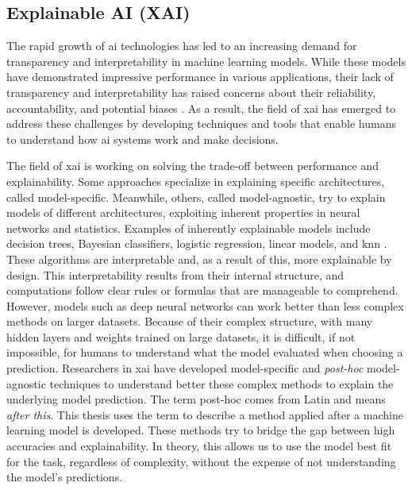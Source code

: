 
\subsection{Explainable AI (XAI)}
The rapid growth of \gls{ai} technologies has led to an increasing demand for transparency and interpretability in machine learning models. While these models have demonstrated impressive performance in various applications, their lack of transparency and interpretability has raised concerns about their reliability, accountability, and potential biases \cite{dattaAutomatedExperimentsAd2015, ntoutsiBiasDatadrivenArtificial2020}. As a result, the field of \gls{xai} has emerged to address these challenges by developing techniques and tools that enable humans to understand how \gls{ai} systems work and make decisions.


The field of \gls{xai} is working on solving the trade-off between performance and explainability. Some approaches specialize in explaining specific architectures, called model-specific. Meanwhile, others, called model-agnostic, try to explain models of different architectures, exploiting inherent properties in neural networks and statistics. Examples of inherently explainable models include decision trees, Bayesian classifiers, logistic regression, linear models, and \gls{knn} \cite{fixDiscriminatoryAnalysisNonparametric1989, coverNearestNeighborPattern1967, molnarInterpretableMachineLearning}. These algorithms are interpretable and, as a result of this, more explainable by design. This interpretability results from their internal structure, and computations follow clear rules or formulas that are manageable to comprehend.
However, models such as deep neural networks can work better than less complex methods on larger datasets. Because of their complex structure, with many hidden layers and weights trained on large datasets, it is difficult, if not impossible, for humans to understand what the model evaluated when choosing a prediction. Researchers in \gls{xai} have developed model-specific and \textit{post-hoc} model-agnostic techniques to understand better these complex methods to explain the underlying model prediction. The term post-hoc comes from Latin and means \textit{after this}. This thesis uses the term to describe a method applied after a machine learning model is developed. These methods try to bridge the gap between high accuracies and explainability.
In theory, this allows us to use the model best fit for the task, regardless of complexity, without the expense of not understanding the model's predictions. 



